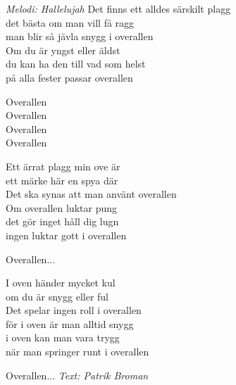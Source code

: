 {\footnotesize\textit{Melodi: Hallelujah}}
\vspace{10pt}
Det finns ett alldes särskilt plagg \\
det bästa om man vill få ragg\\
man blir så jävla snygg i overallen\\
Om du är yngst eller äldst\\
du kan ha den till vad som helst\\
på alla fester passar overallen\par
\vspace{10pt}
Overallen\\
Overallen\\
Overallen\\
Overallen\par
\vspace{10pt}
Ett ärrat plagg min ove är\\
ett märke här en spya där\\
Det ska synas att man använt overallen\\
Om overallen luktar pung\\
det gör inget håll dig lugn\\
ingen luktar gott i overallen\par
\vspace{10pt}
Overallen...\par
\vspace{10pt}
I oven händer mycket kul\\
om du är snygg eller ful\\
Det spelar ingen roll i overallen\\
för i oven är man alltid snygg\\
i oven kan man vara trygg\\
när man springer runt i overallen\par
\vspace{10pt}
Overallen...
\vspace{10pt}
{\footnotesize\textit{Text: Patrik Broman}}
